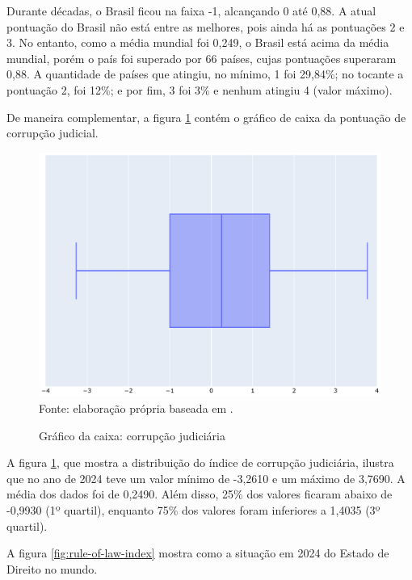 Durante décadas, o Brasil ficou na faixa -1, alcançando 0 até 0,88. A atual pontuação do Brasil não está entre as melhores, pois ainda há as pontuações 2 e 3. No entanto, como a média mundial foi 0,249, o Brasil está acima da média mundial, porém o país foi superado por 66 países, cujas pontuações superaram 0,88. A quantidade de países que atingiu, no mínimo, 1 foi 29,84\%; no tocante a pontuação 2, foi 12\%; e por fim, 3 foi 3\% e nenhum atingiu 4 (valor máximo).

De maneira complementar, a figura \ref{fig:quartis_corrupcao_judiciaria} contém o gráfico de caixa da pontuação de corrupção judicial.

\begin{figure}[H]
    \centering
    \caption{Gráfico da caixa: corrupção judiciária}
    \includegraphics[width=1\linewidth]{figuras/quartis_corrupcao_judiciaria}
    \label{fig:quartis_corrupcao_judiciaria}
    \footnotesize{Fonte: elaboração própria baseada em \cite{judicial-corruption-score}.}
\end{figure}

A figura \ref{fig:quartis_corrupcao_judiciaria}, que mostra a distribuição do índice de corrupção judiciária, ilustra que no ano de 2024 teve um valor mínimo de -3,2610 e um máximo de 3,7690. A média dos dados foi de 0,2490. Além disso, 25\% dos valores ficaram abaixo de -0,9930 (1º quartil), enquanto 75\% dos valores foram inferiores a 1,4035 (3º quartil).

A figura \ref{fig:rule-of-law-index} mostra como a situação em 2024 do Estado de Direito no mundo.

